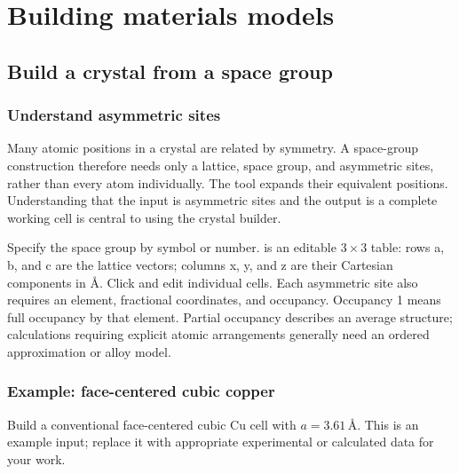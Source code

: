 \chapter{Building materials models}\label{ch:advanced}


\section{Build a crystal from a space group}

\subsection{Understand asymmetric sites}

Many atomic positions in a crystal are related by symmetry. A space-group construction therefore needs only a lattice, space group, and asymmetric sites, rather than every atom individually. The tool expands their equivalent positions. Understanding that the input is asymmetric sites and the output is a complete working cell is central to using the crystal builder.

Specify the space group by symbol or number.  is an editable $3\times3$ table: rows a, b, and c are the lattice vectors; columns x, y, and z are their Cartesian components in \AA. Click and edit individual cells. Each asymmetric site also requires an element, fractional coordinates, and occupancy. Occupancy 1 means full occupancy by that element. Partial occupancy describes an average structure; calculations requiring explicit atomic arrangements generally need an ordered approximation or alloy model.

\subsection{Example: face-centered cubic copper}

Build a conventional face-centered cubic Cu cell with $a=3.61\,\text{\AA}$. This is an example input; replace it with appropriate experimental or calculated data for your work.

